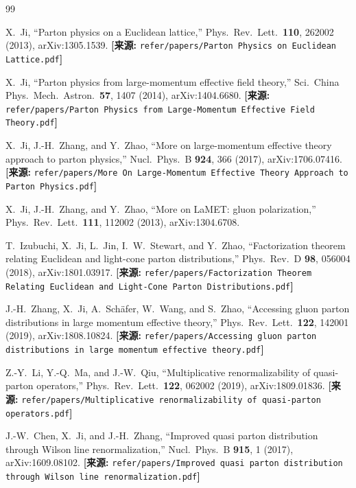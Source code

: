 \documentclass[12pt,a4paper]{ctexart}
\theoremstyle{definition}
\begin{document}
\begin{thebibliography}{99}

X.~Ji, ``Parton physics on a Euclidean lattice,''
Phys.\ Rev.\ Lett.\ \textbf{110}, 262002 (2013), arXiv:1305.1539.
\quad\textbf{[来源:} \texttt{refer/papers/Parton Physics on Euclidean Lattice.pdf}\textbf{]}

X.~Ji, ``Parton physics from large-momentum effective field theory,''
Sci.\ China Phys.\ Mech.\ Astron.\ \textbf{57}, 1407 (2014), arXiv:1404.6680.
\quad\textbf{[来源:} \texttt{refer/papers/Parton Physics from Large-Momentum Effective Field Theory.pdf}\textbf{]}

X.~Ji, J.-H.~Zhang, and Y.~Zhao, ``More on large-momentum effective theory approach to parton physics,''
Nucl.\ Phys.\ B \textbf{924}, 366 (2017), arXiv:1706.07416.
\quad\textbf{[来源:} \texttt{refer/papers/More On Large-Momentum Effective Theory Approach to Parton Physics.pdf}\textbf{]}

X.~Ji, J.-H.~Zhang, and Y.~Zhao, ``More on LaMET: gluon polarization,''
Phys.\ Rev.\ Lett.\ \textbf{111}, 112002 (2013), arXiv:1304.6708.

T.~Izubuchi, X.~Ji, L.~Jin, I.~W.~Stewart, and Y.~Zhao,
``Factorization theorem relating Euclidean and light-cone parton distributions,''
Phys.\ Rev.\ D \textbf{98}, 056004 (2018), arXiv:1801.03917.
\quad\textbf{[来源:} \texttt{refer/papers/Factorization Theorem Relating Euclidean and Light-Cone Parton Distributions.pdf}\textbf{]}

J.-H.~Zhang, X.~Ji, A.~Sch\"afer, W.~Wang, and S.~Zhao,
``Accessing gluon parton distributions in large momentum effective theory,''
Phys.\ Rev.\ Lett.\ \textbf{122}, 142001 (2019), arXiv:1808.10824.
\quad\textbf{[来源:} \texttt{refer/papers/Accessing gluon parton distributions in large momentum effective theory.pdf}\textbf{]}

Z.-Y.~Li, Y.-Q.~Ma, and J.-W.~Qiu,
``Multiplicative renormalizability of quasi-parton operators,''
Phys.\ Rev.\ Lett.\ \textbf{122}, 062002 (2019), arXiv:1809.01836.
\quad\textbf{[来源:} \texttt{refer/papers/Multiplicative renormalizability of quasi-parton operators.pdf}\textbf{]}

J.-W.~Chen, X.~Ji, and J.-H.~Zhang,
``Improved quasi parton distribution through Wilson line renormalization,''
Nucl.\ Phys.\ B \textbf{915}, 1 (2017), arXiv:1609.08102.
\quad\textbf{[来源:} \texttt{refer/papers/Improved quasi parton distribution through Wilson line renormalization.pdf}\textbf{]}


\end{thebibliography}
\end{document}
